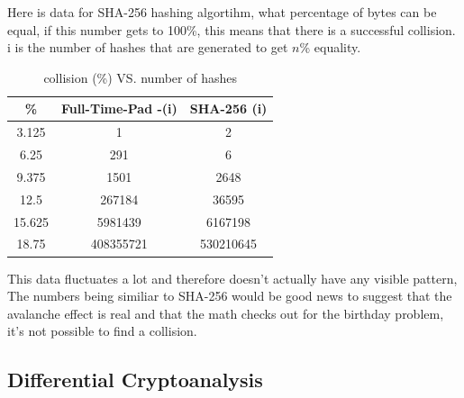 \documentclass[fleqn, a4paper,12pt]{article}
\begin{document}
Here is data for SHA-256 hashing algortihm, what percentage of bytes can be equal, if this number gets to 100\%, this means that there is a successful collision. i is the number of hashes that are generated to get $n$\% equality.

\begin{table}[h!]
\centering
\begin{tabular}{|c|c|c|}
\hline
\textbf{\%} & \textbf{Full-Time-Pad -(i)} & \textbf{SHA-256 (i)} \\
\hline
		3.125 & 1 & 2 \\
\hline
		6.25 & 291 & 6 \\
\hline
		9.375 & 1501 & 2648 \\
\hline
		12.5 & 267184 & 36595 \\
\hline
		15.625 & 5981439 & 6167198  \\
\hline
		18.75 & 408355721 & 530210645 \\
\hline
\end{tabular}
\caption{collision (\%) VS. number of hashes}
\end{table}

This data fluctuates a lot and therefore doesn't actually have any visible pattern, The numbers being similiar to SHA-256 would be good news to suggest that the avalanche effect is real and that the math checks out for the birthday problem, it's not possible to find a collision.

%


\subsection{Differential Cryptoanalysis}
\end{document}
